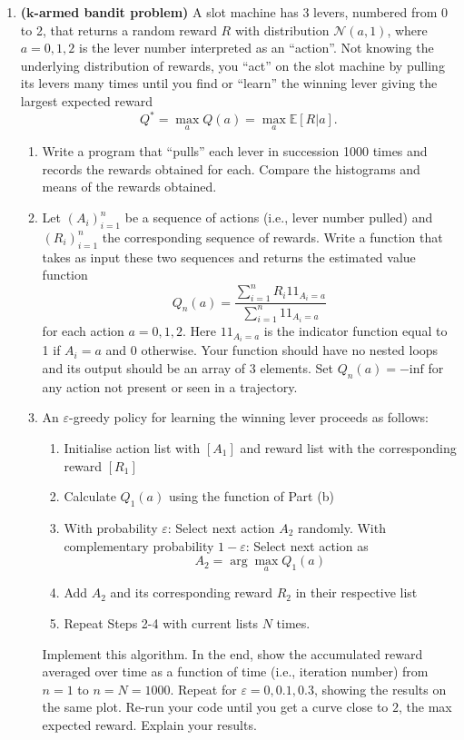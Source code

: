 \documentclass[11pt,a4paper]{article}
\newcommand{\cN}{\mathcal{N}}
\newcommand{\idf}{1\!\!1}
\newcommand{\eps}{\varepsilon}
\begin{document}
\begin{enumerate}[\bf Q1.]
\item \textbf{($\mathbf{k}$-armed bandit problem)} A slot machine has 3 levers, numbered from 0 to 2, that returns a random reward $R$ with distribution $\cN(a,1)$, where $a=0,1,2$ is the lever number interpreted as an ``action''. Not knowing the underlying distribution of rewards, you ``act'' on the slot machine by pulling its levers many times until you find or ``learn'' the winning lever giving the largest expected reward
\[
Q^* = \max_a Q(a) = \max_a \mathbb{E}[R|a].
\]
\begin{enumerate}[\bf (a)]
\item Write a program that ``pulls'' each lever in succession 1000 times and records the rewards obtained for each. Compare the histograms and means of the rewards obtained.
\item Let $(A_i)_{i=1}^n$ be a sequence of actions (i.e., lever number pulled) and $(R_i)_{i=1}^n$ the corresponding sequence of rewards. Write a function that takes as input these two sequences and returns the estimated value function
\[
Q_n(a) =\frac{\sum_{i=1}^n R_i \idf_{A_i=a}}{\sum_{i=1}^n  \idf_{A_i=a}}
\]
for each action $a=0,1,2$. Here $\idf_{A_i=a}$ is the indicator function equal to 1 if $A_i=a$ and 0 otherwise. Your function should have no nested loops and its output should be an array of 3 elements. Set $Q_n(a)=-\textrm{inf}$ for any action not present or seen in a trajectory.

\item An $\eps$-greedy policy for learning the winning lever proceeds as follows:
\begin{enumerate}[1-$\!\!$]
\item Initialise action list with $[A_1]$ and reward list with the corresponding reward $[R_1]$
\item Calculate $Q_1(a)$ using the function of Part (b)
\item With probability $\eps$: Select next action $A_2$ randomly. With complementary probability $1-\eps$: Select next action as
\[
A_2 = \arg\max_a Q_1(a)
\]
\item Add $A_2$ and its corresponding reward $R_2$ in their respective list
\item Repeat Steps 2-4 with current lists $N$ times.	
\end{enumerate}
Implement this algorithm. In the end, show the accumulated reward averaged over time as a function of time (i.e., iteration number) from $n=1$ to $n=N=1000$. Repeat for $\eps=0, 0.1, 0.3$, showing the results on the same plot. Re-run your code until you get a curve close to $2$, the max expected reward. Explain your results.


\end{enumerate}
\end{enumerate}
\end{document}
